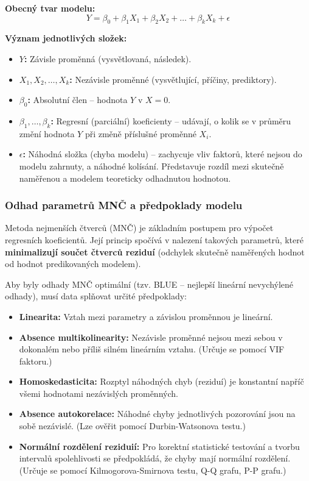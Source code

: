 \textbf{Obecný tvar modelu:}
$$Y = \beta_0 + \beta_1 X_1 + \beta_2 X_2 + \dots + \beta_k X_k + \epsilon$$

\textbf{Význam jednotlivých složek:}
\begin{itemize}
    \item \textbf{$Y$:} Závisle proměnná (vysvětlovaná, následek).
    \item \textbf{$X_1, X_2, \dots, X_k$:} Nezávisle proměnné (vysvětlující, příčiny, prediktory).
    \item \textbf{$\beta_0$:} Absolutní člen -- hodnota $Y$ v $X = 0$.
    \item \textbf{$\beta_1, \dots, \beta_k$:} Regresní (parciální) koeficienty -- udávají, o kolik se v průměru změní hodnota $Y$ při změně příslušné proměnné $X_i$.
    \item \textbf{$\epsilon$:} Náhodná složka (chyba modelu) -- zachycuje vliv faktorů, které nejsou do modelu zahrnuty, a náhodné kolísání. Představuje rozdíl mezi skutečně naměřenou a modelem teoreticky odhadnutou hodnotou.
\end{itemize}

\subsubsection*{Odhad parametrů MNČ a předpoklady modelu}
Metoda nejmenších čtverců (MNČ) je základním postupem pro výpočet regresních koeficientů. Její princip spočívá v nalezení takových parametrů, které \textbf{minimalizují součet čtverců reziduí} (odchylek skutečně naměřených hodnot od hodnot predikovaných modelem).

Aby byly odhady MNČ optimální (tzv. BLUE -- nejlepší lineární nevychýlené odhady), musí data splňovat určité předpoklady:
\begin{itemize}
    \item \textbf{Linearita:} Vztah mezi parametry a závislou proměnnou je lineární.
    \item \textbf{Absence multikolinearity:} Nezávisle proměnné nejsou mezi sebou v dokonalém nebo příliš silném lineárním vztahu. (Určuje se pomocí VIF faktoru.)
    \item \textbf{Homoskedasticita:} Rozptyl náhodných chyb (reziduí) je konstantní napříč všemi hodnotami nezávislých proměnných.
    \item \textbf{Absence autokorelace:} Náhodné chyby jednotlivých pozorování jsou na sobě nezávislé. (Lze ověřit pomocí Durbin-Watsonova testu.)
    \item \textbf{Normální rozdělení reziduií:} Pro korektní statistické testování a tvorbu intervalů spolehlivosti se předpokládá, že chyby mají normální rozdělení. (Určuje se pomocí Kilmogorova-Smirnova testu, Q-Q grafu, P-P grafu.)
\end{itemize}

